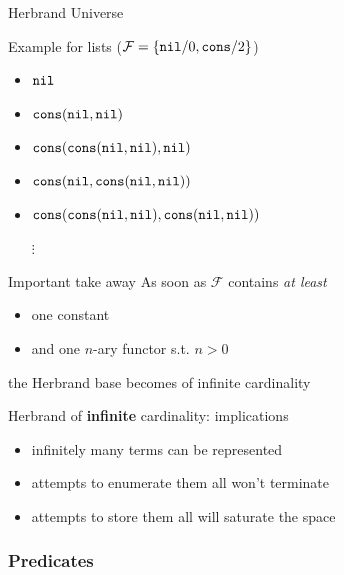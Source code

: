 \documentclass[presentation]{beamer}\mode<presentation>{\usetheme{AMSBolognaFC}}
\begin{document}
\begin{frame}[allowframebreaks]{Herbrand Universe}
    \begin{exampleblock}{Example for lists ($\mathcal{F} = \{ \mathtt{nil}/0, \mathtt{cons}/2 \}$)}
        \begin{itemize}
            \item $\mathtt{nil}$
            \item $\mathtt{cons}(\mathtt{nil}, \mathtt{nil})$
            \item $\mathtt{cons}(\mathtt{cons}(\mathtt{nil}, \mathtt{nil}), \mathtt{nil})$
            \item $\mathtt{cons}(\mathtt{nil}, \mathtt{cons}(\mathtt{nil}, \mathtt{nil}))$
            \item $\mathtt{cons}(\mathtt{cons}(\mathtt{nil}, \mathtt{nil}), \mathtt{cons}(\mathtt{nil}, \mathtt{nil}))$
            \item[$\vdots$]
        \end{itemize}
    \end{exampleblock}

    \begin{alertblock}{Important take away}
        As soon as $\mathcal{F}$ contains \emph{at least}
        \begin{itemize}
            \item one constant
            \item and one $n$-ary functor s.t. $n>0$
        \end{itemize}
        the Herbrand base becomes of \alert{infinite} cardinality
    \end{alertblock}

    \begin{block}{Herbrand of \textbf{infinite} cardinality: implications}
        \begin{itemize}
            \item infinitely many terms can be represented
            \item attempts to enumerate them all won't terminate
            \item attempts to store them all will saturate the space
        \end{itemize}
    \end{block}
\end{frame}

\subsubsection{Predicates}
\end{document}
